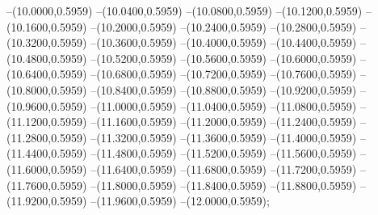 {	--(10.0000,0.5959)
	--(10.0400,0.5959)
	--(10.0800,0.5959)
	--(10.1200,0.5959)
	--(10.1600,0.5959)
	--(10.2000,0.5959)
	--(10.2400,0.5959)
	--(10.2800,0.5959)
	--(10.3200,0.5959)
	--(10.3600,0.5959)
	--(10.4000,0.5959)
	--(10.4400,0.5959)
	--(10.4800,0.5959)
	--(10.5200,0.5959)
	--(10.5600,0.5959)
	--(10.6000,0.5959)
	--(10.6400,0.5959)
	--(10.6800,0.5959)
	--(10.7200,0.5959)
	--(10.7600,0.5959)
	--(10.8000,0.5959)
	--(10.8400,0.5959)
	--(10.8800,0.5959)
	--(10.9200,0.5959)
	--(10.9600,0.5959)
	--(11.0000,0.5959)
	--(11.0400,0.5959)
	--(11.0800,0.5959)
	--(11.1200,0.5959)
	--(11.1600,0.5959)
	--(11.2000,0.5959)
	--(11.2400,0.5959)
	--(11.2800,0.5959)
	--(11.3200,0.5959)
	--(11.3600,0.5959)
	--(11.4000,0.5959)
	--(11.4400,0.5959)
	--(11.4800,0.5959)
	--(11.5200,0.5959)
	--(11.5600,0.5959)
	--(11.6000,0.5959)
	--(11.6400,0.5959)
	--(11.6800,0.5959)
	--(11.7200,0.5959)
	--(11.7600,0.5959)
	--(11.8000,0.5959)
	--(11.8400,0.5959)
	--(11.8800,0.5959)
	--(11.9200,0.5959)
	--(11.9600,0.5959)
	--(12.0000,0.5959);
}
